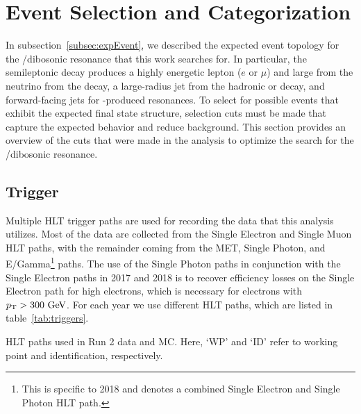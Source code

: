 
\section{Event Selection and Categorization}
\label{sec:events}

In subsection~\ref{subsec:expEvent}, we described the expected event topology for the \WV/\WH dibosonic resonance that this work searches for.
In particular, the semileptonic decay produces a highly energetic lepton ($e$ or $\mu$) and large \ptmiss from the neutrino from the \Wtolnu decay, a large-radius jet from the hadronic \Vtoqqbarpr or \Htobbbar decay, and forward-facing \VBF jets for \VBF-produced resonances.
To select for possible events that exhibit the expected final state structure, selection cuts must be made that capture the expected behavior and reduce background.
This section provides an overview of the cuts that were made in the analysis to optimize the search for the \WV/\WH dibosonic resonance.

\subsection{Trigger}

Multiple HLT trigger paths are used for recording the data that this analysis utilizes.
Most of the data are collected from the Single Electron and Single Muon HLT paths, with the remainder coming from the MET, Single Photon, and E/Gamma\footnote{This is specific to 2018 and denotes a combined Single Electron and Single Photon HLT path.} paths.
The use of the Single Photon paths in conjunction with the Single Electron paths in 2017 and 2018 is to recover efficiency losses on the Single Electron path for high \pt electrons, which is necessary for electrons with $\pt>300\unit{GeV}$.
For each year we use different HLT paths, which are listed in table~\ref{tab:triggers}.%

\begin{table}[htbp]
  \centering
  
  \caption{
    HLT paths used in Run 2 data and MC. Here, `WP' and `ID' refer to working point and identification, respectively.
  }
  \label{tab:triggers}
\end{table}

